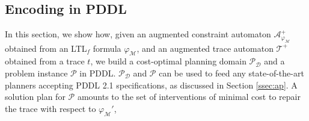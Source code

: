 \subsection{Encoding in PDDL}\label{ssec:eip}

\newcommand{\myi}{\emph{(i)}\xspace}
\newcommand{\myii}{\emph{(ii)}\xspace}
\newcommand{\myiii}{\emph{(iii)}\xspace}
\newcommand{\myiv}{\emph{(iv)}\xspace}
\newcommand{\myv}{\emph{(v)}\xspace}
\newcommand{\myvi}{\emph{(vi)}\xspace}
\newcommand{\A}{\mathcal{A}}
\newcommand{\T}{\mathcal{T}}
\newcommand{\PDDL}[1]{\begin{footnotesize}\texttt{#1}\end{footnotesize}}

\sloppypar

In this section, we show how, given an augmented constraint automaton $\mathcal{A}_{\varphi_{\mathcal{M}}}^+$ obtained from an LTL$_f$ formula  $\varphi_{\mathcal{M}}$, and an augmented trace automaton $\T^+$ obtained from a trace $t$, we build a cost-optimal planning domain $\mathcal{P_D}$ and a problem instance $\mathcal{P}$ in PDDL. $\mathcal{P_D}$ and $\mathcal{P}$ can be used to feed any state-of-the-art planners accepting PDDL 2.1 specifications, as discussed in Section \ref{ssec:ap}.
%
A solution plan for $\mathcal{P}$ amounts to the set of interventions of minimal cost to repair the trace with respect to $\varphi_{\mathcal{M}}'$,


